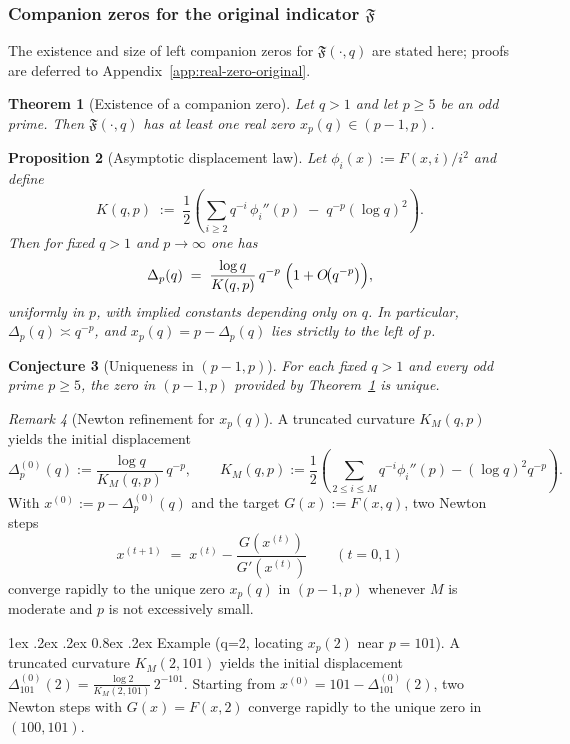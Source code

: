 \documentclass[11pt,a4paper]{amsart}
\makeatletter
\newcommand{\F}{F}
\renewcommand\paragraph{\@startsection{paragraph}{4}{\z@}%
  {1ex \@plus .2ex \@minus .2ex}%
  {0.8ex \@plus .2ex}%
  {\normalfont\bfseries}}
\theoremstyle{plain}
\newtheorem{theorem}{Theorem}[section]
\newtheorem{conjecture}[theorem]{Conjecture}
\newtheorem{proposition}[theorem]{Proposition}
\theoremstyle{definition}
\theoremstyle{remark}
\newtheorem{remark}[theorem]{Remark}
\makeatother
\begin{document}
\subsubsection{Companion zeros for the original indicator $\mathfrak F$}\label{sec:companions-F}
The existence and size of left companion zeros for $\mathfrak F(\cdot,q)$ are stated here; proofs are deferred to Appendix~\ref{app:real-zero-original}.

\begin{theorem}[Existence of a companion zero]\label{thm:existence-left-companion}
Let $q>1$ and let $p\ge5$ be an odd prime. Then $\mathfrak F(\cdot,q)$ has at least one real zero $x_p(q)\in(p-1,p)$.
\end{theorem}

\begin{proposition}[Asymptotic displacement law]\label{prop:disp-asymp}
Let $\phi_i(x):=F(x,i)/i^2$ and define
\[
K(q,p)\;:=\;\frac{1}{2}\left(\sum_{i\ge2} q^{-i}\,\phi_i''(p)\;-\;q^{-p}(\log q)^2\right).
\]
Then for fixed $q>1$ and $p\to\infty$ one has
\[
\Delta_p(q)\;=\;\frac{\log q}{K(q,p)}\,q^{-p}\;\Bigl(1+O\!\big(q^{-p}\big)\Bigr),
\]
uniformly in $p$, with implied constants depending only on $q$. In particular, $\Delta_p(q)\asymp q^{-p}$, and $x_p(q)=p-\Delta_p(q)$ lies strictly to the left of $p$.
\end{proposition}

\begin{conjecture}[Uniqueness in $(p-1,p)$]\label{conj:uniqueness-companion}
For each fixed $q>1$ and every odd prime $p\ge5$, the zero in $(p-1,p)$ provided by Theorem~\ref{thm:existence-left-companion} is unique.
\end{conjecture}

\begin{remark}[Newton refinement for $x_p(q)$]\label{rem:newton}
A truncated curvature $K_M(q,p)$ yields the initial displacement
\[
\Delta_p^{(0)}(q):=\frac{\log q}{K_M(q,p)}\,q^{-p},\qquad
K_M(q,p):=\frac{1}{2}\!\left(\sum_{2\le i\le M}\! q^{-i}\phi_i''(p)-(\log q)^2 q^{-p}\right).
\]
With $x^{(0)}:=p-\Delta_p^{(0)}(q)$ and the target $G(x):=\F(x,q)$, two Newton steps
\[
x^{(t+1)}\;=\;x^{(t)}-\frac{G(x^{(t)})}{G'(x^{(t)})}\qquad(t=0,1)
\]
converge rapidly to the unique zero $x_p(q)$ in $(p-1,p)$ whenever $M$ is moderate and $p$ is not excessively small.
\end{remark}

\paragraph{Example (q=2, locating $x_p(2)$ near $p=101$).}
A truncated curvature \(K_M(2,101)\) yields the initial displacement \(\Delta^{(0)}_{101}(2)=\frac{\log 2}{K_M(2,101)}\,2^{-101}\). Starting from \(x^{(0)}=101-\Delta^{(0)}_{101}(2)\), two Newton steps with \(G(x)=\F(x,2)\) converge rapidly to the unique zero in \((100,101)\).
\end{document}
